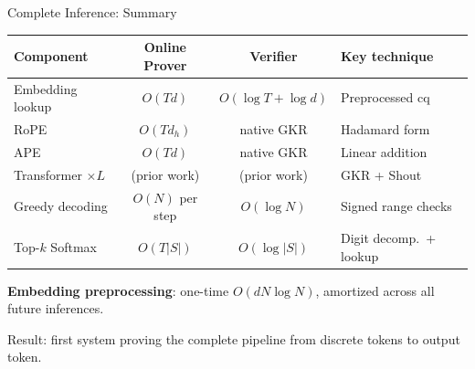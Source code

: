 \documentclass[aspectratio=169,10pt]{beamer}
\newcommand{\pos}[1]{\textcolor{positive}{#1}}
\begin{document}
\begin{frame}{Complete Inference: Summary}
\begin{center}
\begin{tabular}{@{}lccl@{}}
\toprule
\textbf{Component} & \textbf{Online Prover} & \textbf{Verifier} & \textbf{Key technique} \\
\midrule
Embedding lookup & $O(Td)$ & $O(\log T + \log d)$ & Preprocessed cq \\
RoPE & $O(Td_h)$ & native GKR & Hadamard form \\
APE & $O(Td)$ & native GKR & Linear addition \\
Transformer $\times L$ & (prior work) & (prior work) & GKR + Shout \\
Greedy decoding & $O(N)$ per step & $O(\log N)$ & Signed range checks \\
Top-$k$ Softmax & $O(T|S|)$ & $O(\log |S|)$ & Digit decomp.\ + lookup \\
\bottomrule
\end{tabular}
\end{center}

\vspace{6pt}
\textbf{Embedding preprocessing}: one-time $O(dN\log N)$, amortized across all future inferences.

\vspace{4pt}
Result: first system proving the \pos{complete pipeline} from discrete tokens to output token.
\end{frame}

\end{document}
